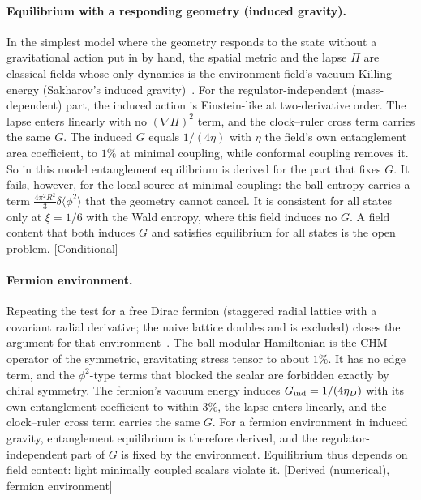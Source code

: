 \documentclass[11pt]{article}
\newcommand{\Pg}{\Pi}                 %
\newcommand{\st}[1]{\textsf{\small[#1]}}
\theoremstyle{plain}
\theoremstyle{definition}
\theoremstyle{remark}
\begin{document}
\paragraph{Equilibrium with a responding geometry (induced gravity).}
In the simplest model where the geometry responds to the state without a gravitational action put in by hand, the spatial metric and the lapse $\Pg$ are classical fields whose only dynamics is the environment field's vacuum Killing energy (Sakharov's induced gravity)~\cite{JordanNote5}. For the regulator-independent (mass-dependent) part, the induced action is Einstein-like at two-derivative order. The lapse enters linearly with no $(\nabla\Pg)^2$ term, and the clock--ruler cross term carries the same $G$. The induced $G$ equals $1/(4\eta)$ with $\eta$ the field's own entanglement area coefficient, to $1\%$ at minimal coupling, while conformal coupling removes it. So in this model entanglement equilibrium is derived for the part that fixes $G$. It fails, however, for the local source at minimal coupling: the ball entropy carries a term $\tfrac{4\pi^2R^2}{3}\delta\langle\phi^2\rangle$ that the geometry cannot cancel. It is consistent for all states only at $\xi=1/6$ with the Wald entropy, where this field induces no $G$. A field content that both induces $G$ and satisfies equilibrium for all states is the open problem. \st{Conditional}

\paragraph{Fermion environment.}
Repeating the test for a free Dirac fermion (staggered radial lattice with a covariant radial derivative; the naive lattice doubles and is excluded) closes the argument for that environment~\cite{JordanNote6}. The ball modular Hamiltonian is the CHM operator of the symmetric, gravitating stress tensor to about $1\%$. It has no edge term, and the $\phi^2$-type terms that blocked the scalar are forbidden exactly by chiral symmetry. The fermion's vacuum energy induces $G_{\rm ind}=1/(4\eta_D)$ with its own entanglement coefficient to within $3\%$, the lapse enters linearly, and the clock--ruler cross term carries the same $G$. For a fermion environment in induced gravity, entanglement equilibrium is therefore derived, and the regulator-independent part of $G$ is fixed by the environment. Equilibrium thus depends on field content: light minimally coupled scalars violate it. \st{Derived (numerical), fermion environment}
\end{document}
